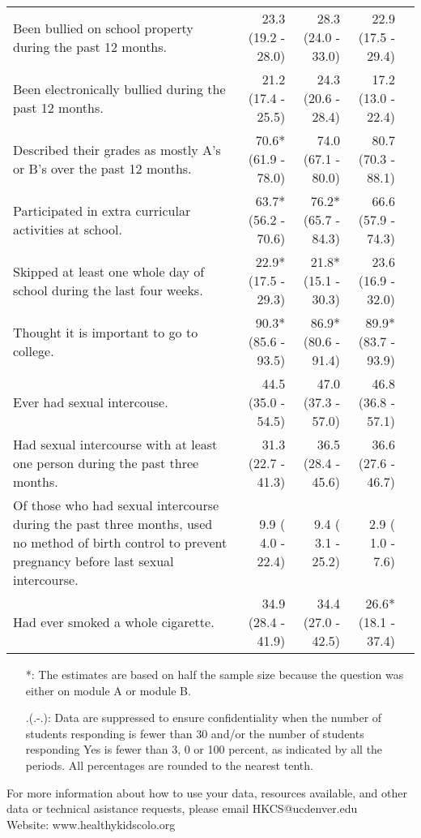 \documentclass[11pt]{article}
\begin{document}
\begin{longtable}{p{12cm}|rrr|r}
  Been bullied on school property during the past 12 months. & 23.3 (19.2 - 28.0) & 28.3 (24.0 - 33.0) & 22.9 (17.5 - 29.4) &  \\ 
  Been electronically bullied during the past 12 months. & 21.2 (17.4 - 25.5) & 24.3 (20.6 - 28.4) & 17.2 (13.0 - 22.4) &  \\ 
  Described their grades as mostly A's or B's over the past 12 months. & 70.6*(61.9 - 78.0) & 74.0 (67.1 - 80.0) & 80.7 (70.3 - 88.1) &  \\ 
  Participated in extra curricular activities at school. & 63.7*(56.2 - 70.6) & 76.2*(65.7 - 84.3) & 66.6 (57.9 - 74.3) &  \\ 
  Skipped at least one whole day of school during the last four weeks. & 22.9*(17.5 - 29.3) & 21.8*(15.1 - 30.3) & 23.6 (16.9 - 32.0) &  \\ 
  Thought it is important to go to college. & 90.3*(85.6 - 93.5) & 86.9*(80.6 - 91.4) & 89.9*(83.7 - 93.9) &  \\ 
  Ever had sexual intercouse. & 44.5 (35.0 - 54.5) & 47.0 (37.3 - 57.0) & 46.8 (36.8 - 57.1) &  \\ 
  Had sexual intercourse with at least one person during the past three months. & 31.3 (22.7 - 41.3) & 36.5 (28.4 - 45.6) & 36.6 (27.6 - 46.7) &  \\ 
  Of those who had sexual intercourse during the past three months, used no method of birth control to prevent pregnancy before last sexual intercourse. &  9.9 ( 4.0 - 22.4) &  9.4 ( 3.1 - 25.2) &  2.9 ( 1.0 -  7.6) &  \\ 
  Had ever smoked a whole cigarette. & 34.9 (28.4 - 41.9) & 34.4 (27.0 - 42.5) & 26.6*(18.1 - 37.4) &  \\ 
  \hline
\end{longtable}\vspace{-0.4cm}

\begin{footnotesize}
\begin{itemize}
\item[*:] The estimates are based on half the sample size because the question was either on module A or module B.
\item[.(.-.):] Data are suppressed to ensure confidentiality when the number of students responding is fewer than 30 and/or the number of students responding Yes is fewer than 3, 0 or 100 percent, as indicated by all the periods. All percentages are rounded to the nearest tenth.
\end{itemize}
\end{footnotesize}

\noindent For more information about how to use your data, resources available, and other data or technical asistance requests, please email HKCS@ucdenver.edu
\\
\noindent Website: www.healthykidscolo.org
\end{document}
